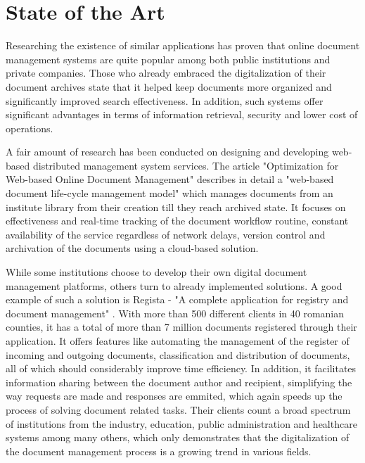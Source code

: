 \chapter{State of the Art}
\label{chapter:stateOfTheArt}

Researching the existence of similar applications has proven that online document management systems are quite popular among both public institutions and private companies. Those who already embraced the digitalization of their document archives state that it helped keep documents more organized and significantly improved search effectiveness. In addition, such systems offer significant advantages in terms of information retrieval, security and lower cost of operations.

A fair amount of research has been conducted on designing and developing web-based distributed management system services. The article "Optimization for Web-based Online Document Management" \cite{Cheng-2013} describes in detail a "web-based document life-cycle management model" which manages documents from an institute library from their creation till they reach archived state. It focuses on effectiveness and real-time tracking of the document workflow routine, constant availability of the service regardless of network delays, version control and archivation of the documents using a cloud-based solution.


While some institutions choose to develop their own digital document management platforms, others turn to already implemented solutions. A good example of such a solution is Regista - "A complete application for registry and document management" \cite{regista}. With more than 500 different clients in 40 romanian counties, it has a total of more than 7 million documents registered through their application. It offers features like automating the management of the register of incoming and outgoing documents, classification and distribution of documents, all of which should considerably improve time efficiency. In addition, it facilitates information sharing between the document author and recipient, simplifying the way requests are made and responses are emmited, which again speeds up the process of solving document related tasks. Their clients count a broad spectrum of institutions from the industry, education, public administration and healthcare systems among many others, which only demonstrates that the digitalization of the document management process is a growing trend in various fields.


